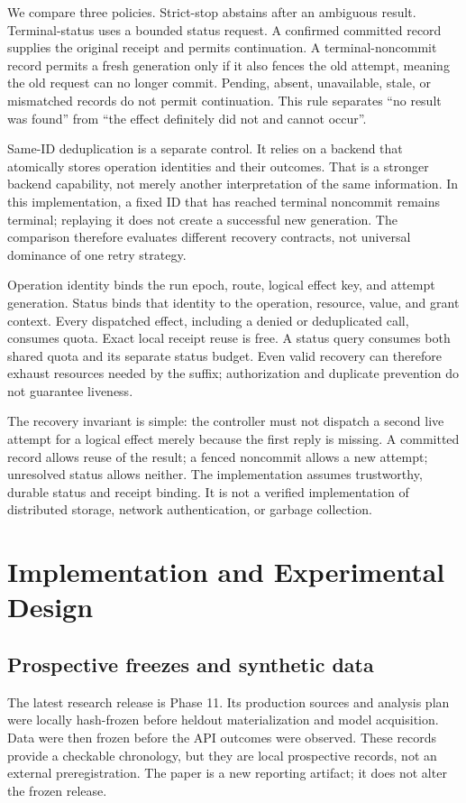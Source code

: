 \documentclass[conference]{IEEEtran}
\begin{document}
We compare three policies. Strict-stop abstains after an ambiguous result. Terminal-status uses a bounded status request. A confirmed committed record supplies the original receipt and permits continuation. A terminal-noncommit record permits a fresh generation only if it also fences the old attempt, meaning the old request can no longer commit. Pending, absent, unavailable, stale, or mismatched records do not permit continuation. This rule separates ``no result was found'' from ``the effect definitely did not and cannot occur''.

Same-ID deduplication is a separate control. It relies on a backend that atomically stores operation identities and their outcomes. That is a stronger backend capability, not merely another interpretation of the same information. In this implementation, a fixed ID that has reached terminal noncommit remains terminal; replaying it does not create a successful new generation. The comparison therefore evaluates different recovery contracts, not universal dominance of one retry strategy.

Operation identity binds the run epoch, route, logical effect key, and attempt generation. Status binds that identity to the operation, resource, value, and grant context. Every dispatched effect, including a denied or deduplicated call, consumes quota. Exact local receipt reuse is free. A status query consumes both shared quota and its separate status budget. Even valid recovery can therefore exhaust resources needed by the suffix; authorization and duplicate prevention do not guarantee liveness.

The recovery invariant is simple: the controller must not dispatch a second live attempt for a logical effect merely because the first reply is missing. A committed record allows reuse of the result; a fenced noncommit allows a new attempt; unresolved status allows neither. The implementation assumes trustworthy, durable status and receipt binding. It is not a verified implementation of distributed storage, network authentication, or garbage collection.

\section{Implementation and Experimental Design}
\label{sec:design}
\subsection{Prospective freezes and synthetic data}
The latest research release is Phase 11. Its production sources and analysis plan were locally hash-frozen before heldout materialization and model acquisition. Data were then frozen before the API outcomes were observed. These records provide a checkable chronology, but they are local prospective records, not an external preregistration. The paper is a new reporting artifact; it does not alter the frozen release.
\end{document}
